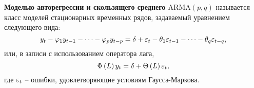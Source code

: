 
\begin{definition}
    \textbf{Моделью авторегрессии и скользящего среднего $\mathrm{ARMA}\left( p, q \right)$} называется класс моделей стационарных временных рядов, задаваемый уравнением следующего вида:
    \begin{equation*}
        y_t - \varphi_1 y_{t-1} - \dots - \varphi_p y_{t-p} = \delta + \varepsilon_t - \theta_1 \varepsilon_{t-1} - \dots - \theta_q \varepsilon_{t-q},
    \end{equation*}
    или, в записи с использованием оператора лага,
    \begin{equation*}
        \Phi\left( L \right) y_t = \delta + \Theta \left( L \right) \varepsilon_t,
    \end{equation*}
    где $\varepsilon_t$ -- ошибки, удовлетворяющие условиям Гаусса-Маркова.
\end{definition}


